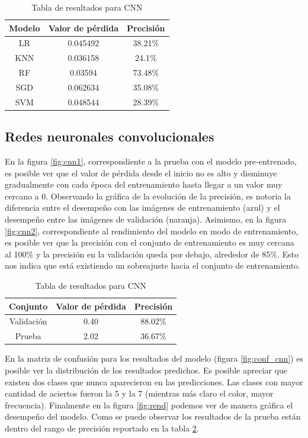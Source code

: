 \documentclass[transmag]{IEEEtran}
\begin{document}
\begin{table}[H]
	\centering
	\begin{tabular}{|c|c|c|}
		\toprule
		Modelo & Valor de pérdida & Precisión\\
		\hline	
		LR & 0.045492 & 38.21\% \\
		KNN & 0.036158 & 24.1\%\\
		RF & 0.03594 & 73.48\%\\
		SGD & 0.062634 & 35.08\%\\
		SVM & 0.048544 & 28.39\%\\

		\bottomrule
	\end{tabular}
	\caption{Tabla de resultados para CNN}
	\label{tab:res_trad}
\end{table}


\subsection{Redes neuronales convolucionales}


En la figura \ref{fig:cnn1}, correspondiente a la prueba con el modelo pre-entrenado, es posible ver que el valor de pérdida desde el inicio no es alto y disminuye gradualmente con cada época del entrenamiento hasta llegar a un valor muy cercano a 0. Observando la gráfica de la evolución de la precisión, es notoria la diferencia entre el desempeño con las imágenes de entrenamiento (azul) y el desempeño entre las imágenes de validación (naranja). Asimismo, en la figura \ref{fig:cnn2}, correspondiente al rendimiento del modelo en modo de entrenamiento, es posible ver que la precisión con el conjunto de entrenamiento es muy cercana al 100\% y la precisión en la validación queda por debajo, alrededor de 85\%. Esto nos indica que está existiendo un sobreajuste hacia el conjunto de entrenamiento.

\begin{table}[H]
	\centering
	\begin{tabular}{|c|c|c|}
		\toprule
		Conjunto & Valor de pérdida & Precisión\\
		\hline	
		Validación &  0.40 & 88.02\% \\
		Prueba & 2.02 & 36.67\%\\
		\bottomrule
	\end{tabular}
	\caption{Tabla de resultados para CNN}
	\label{tab:res_cnn}
\end{table}

En la matriz de confusión para los resultados del modelo (figura \ref{fig:conf_cnn}) es posible ver la distribución de los resultados predichos. Es posible apreciar que existen dos clases que nunca aparecieron en las predicciones. Las clases con mayor cantidad de aciertos fueron la 5 y la 7 (mientras más claro el color, mayor frecuencia). Finalmente en la figura \ref{fig:rend} podemos ver de manera gráfica el desempeño del modelo. Como se puede observar los resultados de la prueba están dentro del rango de precisión reportado en la tabla \ref{tab:res_cnn}.
\end{document}
